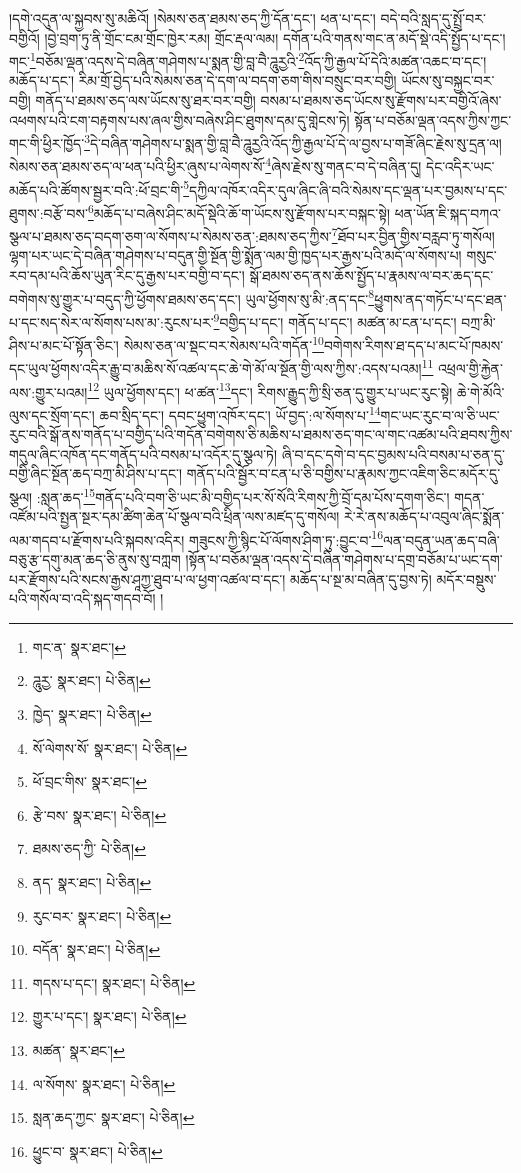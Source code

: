 །དགེ་འདུན་ལ་སྐྱབས་སུ་མཆིའོ། །སེམས་ཅན་ཐམས་ཅད་ཀྱི་དོན་དང་། ཕན་པ་དང་། བདེ་བའི་སླད་དུ་སྤྲོ་བར་བགྱིའོ། །བྱེ་བྲག་ཏུ་ནི་གྲོང་ངམ་གྲོང་ཁྱེར་རམ། གྲོང་རྡལ་ལམ། དགོན་པའི་གནས་གང་ན་མདོ་སྡེ་འདི་སྤྱོད་པ་དང་། གང་\footnote{གང་ན་  སྣར་ཐང་། }བཅོམ་ལྡན་འདས་དེ་བཞིན་གཤེགས་པ་སྨན་གྱི་བླ་བཻ་ཌཱུརྱའི་\footnote{ཌཱུརྱ་  སྣར་ཐང་།  པེ་ཅིན། }འོད་ཀྱི་རྒྱལ་པོ་དེའི་མཚན་འཆང་བ་དང་། མཆོད་པ་དང་། རིམ་གྲོ་བྱེད་པའི་སེམས་ཅན་དེ་དག་ལ་བདག་ཅག་གིས་བསྲུང་བར་བགྱི། ཡོངས་སུ་བསྐྱང་བར་བགྱི། གནོད་པ་ཐམས་ཅད་ལས་ཡོངས་སུ་ཐར་བར་བགྱི། བསམ་པ་ཐམས་ཅད་ཡོངས་སུ་རྫོགས་པར་བགྱིའོ་ཞེས་འཕགས་པའི་ངག་བརྟགས་པས་ཞལ་གྱིས་བཞེས་ཤིང་ཐུགས་དམ་དུ་གླེངས་ཏེ། སྟོན་པ་བཅོམ་ལྡན་འདས་ཀྱིས་ཀྱང་གང་གི་ཕྱིར་ཁྱོད་\footnote{ཁྱེད་  སྣར་ཐང་།  པེ་ཅིན། }དེ་བཞིན་གཤེགས་པ་སྨན་གྱི་བླ་བཻ་ཌཱུརྱའི་འོད་ཀྱི་རྒྱལ་པོ་དེ་ལ་བྱས་པ་གཟོ་ཞིང་རྗེས་སུ་དྲན་ལ། སེམས་ཅན་ཐམས་ཅད་ལ་ཕན་པའི་ཕྱིར་ཞུས་པ་ལེགས་སོ་\footnote{སོ་ལེགས་སོ་  སྣར་ཐང་།  པེ་ཅིན། }ཞེས་རྗེས་སུ་གནང་བ་དེ་བཞིན་དུ། དེང་འདིར་ཡང་མཆོད་པའི་ཚོགས་སྦྱར་བའི་:ཕོ་བྲང་གི་\footnote{ཕོ་བྲང་གིས་  སྣར་ཐང་། }དཀྱིལ་འཁོར་འདིར་དུལ་ཞིང་ཞི་བའི་སེམས་དང་ལྡན་པར་བྱམས་པ་དང་ཐུགས་:བརྩོ་བས་\footnote{རྩེ་བས་  སྣར་ཐང་།  པེ་ཅིན། }མཆོད་པ་བཞེས་ཤིང་མདོ་སྡེའི་ཆོ་ག་ཡོངས་སུ་རྫོགས་པར་བསྐང་སྟེ། ཕན་ཡོན་ཇི་སྐད་བཀའ་སྩལ་པ་ཐམས་ཅད་བདག་ཅག་ལ་སོགས་པ་སེམས་ཅན་:ཐམས་ཅད་ཀྱིས་\footnote{ཐམས་ཅད་ཀྱི་  པེ་ཅིན། }ཐོབ་པར་བྱིན་གྱིས་བརླབ་ཏུ་གསོལ། ལྷག་པར་ཡང་དེ་བཞིན་གཤེགས་པ་བདུན་གྱི་སྔོན་གྱི་སྨོན་ལམ་གྱི་ཁྱད་པར་རྒྱས་པའི་མདོ་ལ་སོགས་པ། གསུང་རབ་དམ་པའི་ཆོས་ཡུན་རིང་དུ་རྒྱས་པར་བགྱི་བ་དང་། སྒོ་ཐམས་ཅད་ནས་ཆོས་སྤྱོད་པ་རྣམས་ལ་བར་ཆད་དང་བགེགས་སུ་གྱུར་པ་བདུད་ཀྱི་ཕྱོགས་ཐམས་ཅད་དང་། ཡུལ་ཕྱོགས་སུ་མི་:ནད་དང་\footnote{ནད་  སྣར་ཐང་།  པེ་ཅིན། }ཕྱུགས་ནད་གཏོང་པ་དང་ཐན་པ་དང་སད་སེར་ལ་སོགས་པས་མ་:རུངས་པར་\footnote{རུང་བར་  སྣར་ཐང་།  པེ་ཅིན། }བགྱིད་པ་དང་། གནོད་པ་དང་། མཚན་མ་ངན་པ་དང་། བཀྲ་མི་ཤིས་པ་མང་པོ་སྟོན་ཅིང་། སེམས་ཅན་ལ་སྡང་བར་སེམས་པའི་གདོན་\footnote{བདོན་  སྣར་ཐང་།  པེ་ཅིན། }བགེགས་རིགས་ཐ་དད་པ་མང་པོ་ཁམས་དང་ཡུལ་ཕྱོགས་འདིར་རྒྱུ་བ་མཆིས་སོ་འཚལ་དང་ཆེ་གེ་མོ་ལ་སྔོན་གྱི་ལས་ཀྱིས་:འདས་པའམ།\footnote{གདས་པ་དང་།  སྣར་ཐང་།  པེ་ཅིན། } འཕྲལ་གྱི་རྐྱེན་ལས་:གྱུར་པའམ།\footnote{གྱུར་པ་དང་།  སྣར་ཐང་།  པེ་ཅིན། } ཡུལ་ཕྱོགས་དང་། ཕ་ཚན་\footnote{མཚན་  སྣར་ཐང་། }དང་། རིགས་རྒྱུད་ཀྱི་སྲི་ཅན་དུ་གྱུར་པ་ཡང་རུང་སྟེ། ཆེ་གེ་མོའི་ལུས་དང་སྲོག་དང་། ཆབ་སྲིད་དང་། དབང་ཕྱུག་འཁོར་དང་། ཡོ་བྱད་:ལ་སོགས་པ་\footnote{ལ་སོགས་  སྣར་ཐང་།  པེ་ཅིན། }གང་ཡང་རུང་བ་ལ་ཅི་ཡང་རུང་བའི་སྒོ་ནས་གནོད་པ་བགྱིད་པའི་གདོན་བགེགས་ཅི་མཆིས་པ་ཐམས་ཅད་གང་ལ་གང་འཚམ་པའི་ཐབས་ཀྱིས་གདུལ་ཞིང་འཁོན་དང་གནོད་པའི་བསམ་པ་འདོར་དུ་སྩལ་ཏེ། ཞི་བ་དང་དགེ་བ་དང་བྱམས་པའི་བསམ་པ་ཅན་དུ་བགྱི་ཞིང་སྔོན་ཆད་བཀྲ་མི་ཤིས་པ་དང་། གནོད་པའི་སྦྱོར་བ་ངན་པ་ཅི་བགྱིས་པ་རྣམས་ཀྱང་འཇིག་ཅིང་མདོར་དུ་སྩལ། :སླན་ཆད་\footnote{སླན་ཆད་ཀྱང་  སྣར་ཐང་།  པེ་ཅིན། }གནོད་པའི་བག་ཅི་ཡང་མི་བགྱིད་པར་སོ་སོའི་རིགས་ཀྱི་བྲོ་དམ་པོས་དགག་ཅིང་། གདན་འཛོམ་པའི་སྤྱན་སྔར་དམ་ཚིག་ཆེན་པོ་སྩལ་བའི་ཕྲིན་ལས་མཛད་དུ་གསོལ། རེ་རེ་ནས་མཆོད་པ་འབུལ་ཞིང་སྨོན་ལམ་གདབ་པ་རྫོགས་པའི་སྐབས་འདིར། གཟུངས་ཀྱི་སྙིང་པོ་ལོགས་ཤིག་ཏུ་:བྱུང་བ་\footnote{ཕྱུང་བ་  སྣར་ཐང་།  པེ་ཅིན། }ལན་བདུན་ཡན་ཆད་བཞི་བཅུ་རྩ་དགུ་མན་ཆད་ཅི་ནུས་སུ་བཀླག །སྟོན་པ་བཅོམ་ལྡན་འདས་དེ་བཞིན་གཤེགས་པ་དགྲ་བཅོམ་པ་ཡང་དག་པར་རྫོགས་པའི་སངས་རྒྱས་ཤཱཀྱ་ཐུབ་པ་ལ་ཕྱག་འཚལ་བ་དང་། མཆོད་པ་སྔ་མ་བཞིན་དུ་བྱས་ཏེ། མདོར་བསྡུས་པའི་གསོལ་བ་འདི་སྐད་གདབ་བོ། །
